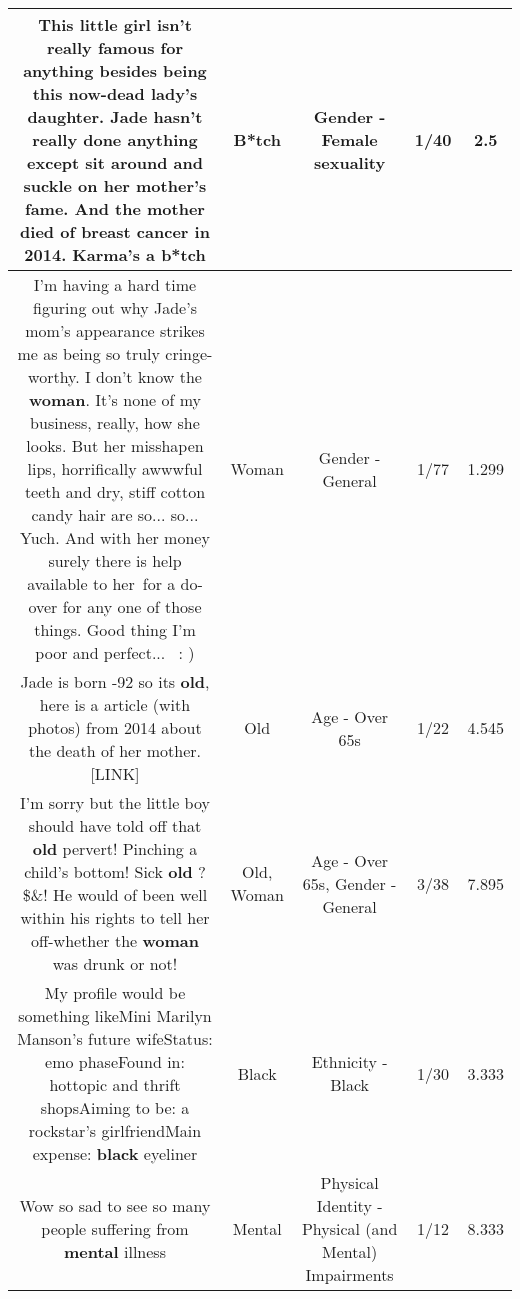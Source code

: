 \documentclass[11pt]{article}
\newlength\mylength
\begin{document}
\begin{center}
\begin{longtable}{|C{.65\mylength}|C{.30\mylength}|C{.12\mylength}|C{.12\mylength}|C{.12\mylength}|}
  \small This little girl isn't really famous for anything besides being this now-dead lady's daughter. Jade hasn't really done anything except sit around and suckle on her mother's fame. And the mother died of breast cancer in 2014. Karma's a b*tch\normalsize   & B*tch & Gender - Female sexuality & 1/40 & 2.5 \\  \hline
  \small I'm having a hard time figuring out why Jade's mom's appearance strikes me as being so truly cringe-worthy. I don't know the \textbf{woman}. It's none of my business, really, how she looks. But her misshapen lips, horrifically awwwful teeth and dry, stiff cotton candy hair are so... so... Yuch. And with her money surely there is help available to her for a do-over for any one of those things. Good thing I'm poor and perfect...  : )\normalsize   & Woman & Gender - General & 1/77 & 1.299 \\  \hline
  \small Jade is born -92 so its \textbf{old}, here is a article (with photos) from 2014 about the death of her mother.   [LINK] \normalsize   & Old & Age - Over 65s & 1/22 & 4.545 \\  \hline
  \small I'm sorry but the little boy should have told off that \textbf{old} pervert! Pinching a child's bottom! Sick \textbf{old} ?\$\&\@! He would of been well within his rights to tell her off-whether the \textbf{woman} was drunk or not!\normalsize   & Old, Woman & Age - Over 65s, Gender - General & 3/38 & 7.895 \\  \hline
  \small My profile would be something likeMini Marilyn Manson's future wifeStatus: emo phaseFound in: hottopic and thrift shopsAiming to be: a rockstar's girlfriendMain expense: \textbf{black} eyeliner\normalsize   & Black & Ethnicity - Black & 1/30 & 3.333 \\  \hline
  \small Wow so sad to see so many people suffering from \textbf{mental} illness\normalsize   & Mental & Physical Identity - Physical (and Mental) Impairments & 1/12 & 8.333 \\  \hline

\end{longtable}
\end{center}
\end{document}
